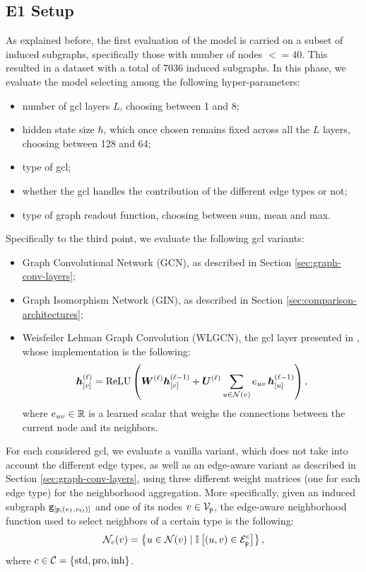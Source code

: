 \subsection{E1 Setup}
As explained before, the first evaluation of the model is carried on a subset of induced subgraphs, specifically those with number of nodes $<= 40$. This resulted in a dataset with a total of 7036 induced subgraphs. In this phase, we evaluate the model selecting among the following hyper-parameters:
\begin{itemize}
    \item number of \gls{gcl} layers $L$, choosing between 1 and 8;
    \item hidden state size $h$, which once chosen remains fixed across all the $L$ layers, choosing between 128 and 64;
    \item type of \gls{gcl};
    \item whether the \gls{gcl} handles the contribution of the different edge types or not;
    \item type of graph readout function, choosing between sum, mean and max.
\end{itemize}
Specifically to the third point, we evaluate the following \gls{gcl} variants:
\begin{itemize}
    \item Graph Convolutional Network (GCN), as described in Section \ref{sec:graph-conv-layers};
    \item Graph Isomorphism Network (GIN), as described in Section \ref{sec:comparison-architectures};
    \item Weisfeiler Lehman Graph Convolution (WLGCN), \ie the \gls{gcl} layer presented in \citep{morris2019weisfeilerlehmangoneural}, whose implementation is the following:
    $$\StateVector{v}{\ell} = \relu\Par{\LayerMatrix{W}{\ell} \StateVector{v}{\ell-1} + \LayerMatrix{U}{\ell} \sum_{u \in \Neigh(v)} e_{uv}\, \StateVector{u}{\ell-1}},$$
    where $e_{uv} \in \mathbb{R}$ is a learned scalar that weighs the connections between the current node and its neighbors.
\end{itemize}
For each considered \gls{gcl}, we evaluate a vanilla variant, which does not take into account the different edge types, as well as an edge-aware variant as described in Section \ref{sec:graph-conv-layers}, using three different weight matrices (one for each edge type) for the neighborhood aggregation. More specifically, given an induced subgraph $\mathtt{g}_{[\mathtt{p}, (v_I,v_O)]}$ and one of its nodes $v \in \Nodes{p}$, the edge-aware neighborhood function used to select neighbors of a certain type is the following:
$$\Neigh_c(v) = \Set{u \in \Neigh(v) \mid \Indicator{(u,v) \in \Edges{p}^c}},$$
where $c \in \Cal{C} = \Set{\Fun{std}, \Fun{pro}, \Fun{inh}}$.

